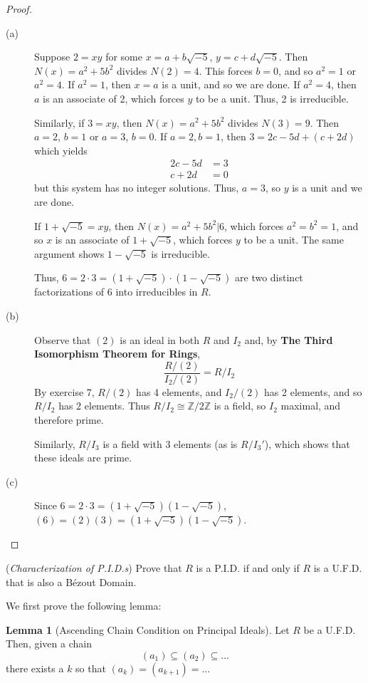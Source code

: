 \documentclass[12pt,leqno]{book}
\numberwithin{equation}{section}
\newcommand{\question}[2] {\vspace{.25in}\noindent\fbox{#1} #2 \vspace{.10in}}
\theoremstyle{definition}
\newtheorem*{Lem}{Lemma}
\begin{document}
\begin{proof}\indent
 \begin{description}
  \item [(a)] Suppose $2=xy$ for some $x=a+b\sqrt{-5}$, $y=c+d\sqrt{-5}$. Then $N(x)=a^2+5b^2$ divides $N(2)=4$. This forces $b=0$, and so $a^2=1$ or $a^2=4$. If $a^2=1$, then $x=a$ is a unit, and so we are done. If $a^2=4$, then $a$ is an associate of 2, which forces $y$ to be a unit. Thus, 2 is irreducible.

Similarly, if $3=xy$, then $N(x)=a^2+5b^2$ divides $N(3)=9$. Then $a=2$, $b=1$ or $a=3$, $b=0$. If $a=2,b=1$, then $3=2c-5d+(c+2d)$ which yields \begin{align*}2c-5d&=3\\c+2d&=0\end{align*} but this system has no integer solutions. Thus, $a=3$, so $y$ is a unit and we are done. 

If $1+\sqrt{-5}=xy$, then $N(x)=a^2+5b^2|6$, which forces $a^2=b^2=1$, and so $x$ is an associate of $1+\sqrt{-5}$, which forces $y$ to be a unit. The same argument shows $1-\sqrt{-5}$ is irreducible.

Thus, $6=2\cdot3=(1+\sqrt{-5})\cdot(1-\sqrt{-5})$ are two distinct factorizations of 6 into irreducibles in $R$.
  \item [(b)] Observe that $(2)$ is an ideal in both $R$ and $I_2$ and, by \textbf{The Third Isomorphism Theorem for Rings}, \[\frac{R/(2)}{I_2/(2)}=R/I_2\] By exercise 7, $R/(2)$ has 4 elements, and $I_2/(2)$ has 2 elements, and so $R/I_2$ has 2 elements. Thus $R/I_2\cong\mathbb{Z}/2\mathbb{Z}$ is a field, so $I_2$ maximal, and therefore prime.

Similarly, $R/I_3$ is a field with 3 elements (as is $R/I_3'$), which shows that these ideals are prime.
  \item [(c)] Since $6=2\cdot3=(1+\sqrt{-5})(1-\sqrt{-5})$, $(6)=(2)(3)=(1+\sqrt{-5})(1-\sqrt{-5})$.\qedhere
 \end{description}

\end{proof}

\question{11}{(\textit{Characterization of P.I.D.s}) Prove that $R$ is a P.I.D. if and only if $R$ is a U.F.D. that is also a B\'ezout Domain.}

We first prove the following lemma:

\begin{Lem}[Ascending Chain Condition on Principal Ideals]
 Let $R$ be a U.F.D. Then, given a chain \[(a_1)\subseteq(a_2)\subseteq\hdots\] there exists a $k$ so that $(a_k)=(a_{k+1})=\hdots$
\end{Lem}
\end{document}
